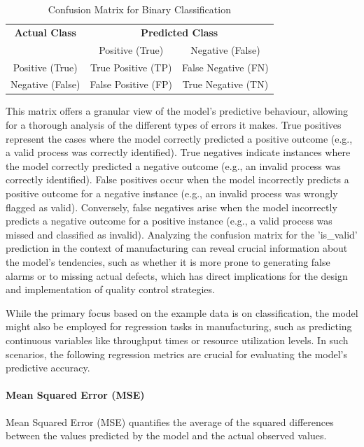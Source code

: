\begin{table}[h!]
  \centering
  \caption{Confusion Matrix for Binary Classification}
  \label{tab:confusion_matrix}
  \begin{tabular}{c|cc}
    \toprule
    \textbf{Actual Class} & \multicolumn{2}{c}{\textbf{Predicted Class}}                       \\
                          & Positive (True)                              & Negative (False)    \\
    \midrule
    Positive (True)       & True Positive (TP)                           & False Negative (FN) \\
    Negative (False)      & False Positive (FP)                          & True Negative (TN)  \\
    \bottomrule
  \end{tabular}
\end{table}

This matrix offers a granular view of the model's predictive behaviour, allowing for a thorough analysis of the different types of errors it makes. True positives represent the cases where the model correctly predicted a positive outcome (e.g., a valid process was correctly identified). True negatives indicate instances where the model correctly predicted a negative outcome (e.g., an invalid process was correctly identified). False positives occur when the model incorrectly predicts a positive outcome for a negative instance (e.g., an invalid process was wrongly flagged as valid). Conversely, false negatives arise when the model incorrectly predicts a negative outcome for a positive instance (e.g., a valid process was missed and classified as invalid). Analyzing the confusion matrix for the 'is\_valid' prediction in the context of manufacturing can reveal crucial information about the model's tendencies, such as whether it is more prone to generating false alarms or to missing actual defects, which has direct implications for the design and implementation of quality control strategies.

While the primary focus based on the example data is on classification, the model might also be employed for regression tasks in manufacturing, such as predicting continuous variables like throughput times or resource utilization levels. In such scenarios, the following regression metrics are crucial for evaluating the model's predictive accuracy.

\paragraph{\textbf{Mean Squared Error (MSE)}}
Mean Squared Error (MSE) quantifies the average of the squared differences between the values predicted by the model and the actual observed values.

